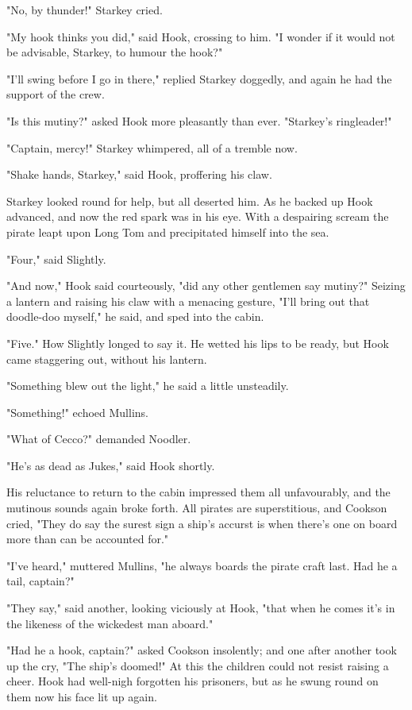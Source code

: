 "No, by thunder!\@" Starkey cried.

"My hook thinks you did," said Hook, crossing to him.
"I wonder if it would not be advisable, Starkey, to humour the hook?"

"I'll swing before I go in there," replied Starkey doggedly,
and again he had the support of the crew.

"Is this mutiny?\@" asked Hook more pleasantly than ever.
"Starkey's ringleader!"

"Captain, mercy!\@" Starkey whimpered, all of a tremble now.

"Shake hands, Starkey," said Hook, proffering his claw.

Starkey looked round for help, but all deserted him.
As he backed up Hook advanced, and now the red spark was in his eye.
With a despairing scream the pirate leapt upon Long Tom and precipitated himself into the sea.

"Four," said Slightly.

"And now," Hook said courteously, "did any other gentlemen say mutiny?"
Seizing a lantern and raising his claw with a menacing gesture,
"I'll bring out that doodle-doo myself," he said, and sped into the cabin.

"Five."
How Slightly longed to say it.
He wetted his lips to be ready, but Hook came staggering out, without his lantern.

"Something blew out the light," he said a little unsteadily.

"Something!\@" echoed Mullins.

"What of Cecco?\@" demanded Noodler.

"He's as dead as Jukes," said Hook shortly.

His reluctance to return to the cabin impressed them all unfavourably,
and the mutinous sounds again broke forth.
All pirates are superstitious, and Cookson cried,
"They do say the surest sign a ship's accurst is when there's one on board more than can be accounted for."

"I've heard," muttered Mullins, "he always boards the pirate craft last.
Had he a tail, captain?"

"They say," said another, looking viciously at Hook,
"that when he comes it's in the likeness of the wickedest man aboard."

"Had he a hook, captain?\@" asked Cookson insolently;
and one after another took up the cry, "The ship's doomed!"
At this the children could not resist raising a cheer.
Hook had well-nigh forgotten his prisoners,
but as he swung round on them now his face lit up again.

